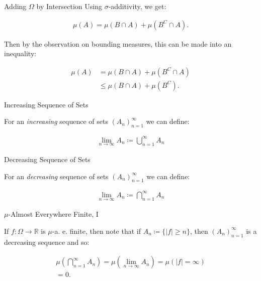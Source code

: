\documentclass[10pt,landscape]{article}
\renewcommand{\leq}{\leqslant}
\renewcommand{\geq}{\geqslant}
\begin{document}
\begin{multicols}{3}
\begin{observation}{}{Adding $\Omega$ by Intersection}
    Using $\sigma$-additivity, we get:

        \begin{align*}
            \mu(A) = \mu(B \cap A) + \mu(B^C \cap A).
        \end{align*}

    Then by the observation on bounding measures, this can be made into an inequality:

        \begin{align*}
            \mu(A) &= \mu(B \cap A) + \mu(B^C \cap A) \\
            &\leq \mu(B \cap A) + \mu(B^C).
        \end{align*}

\end{observation}

\begin{observation}{}{Increasing Sequence of Sets}

    For an \emph{increasing} sequence of sets $(A_n)_{n=1}^{\infty}$ we can define:

        \begin{align*}
            \lim_{n \to \infty} A_n \coloneqq \bigcup_{n=1}^{\infty} A_n
        \end{align*}

\end{observation}

\begin{observation}{}{Decreasing Sequence of Sets}

    For an \emph{decreasing} sequence of sets $(A_n)_{n=1}^{\infty}$ we can define:

        \begin{align*}
            \lim_{n \to \infty} A_n \coloneqq \bigcap_{n=1}^{\infty} A_n
        \end{align*}

\end{observation}

\begin{observation}{}{$\mu$-Almost Everywhere Finite, I}

    If $f: \Omega \to \mathbb{R}$ is $\mu$-a. e. finite, then note that if $A_n \coloneqq \{ |f| \geq n \}$, then $(A_n)_{n=1}^{\infty}$ is a decreasing sequence and so:

        \begin{align*}
            \mu\left(\bigcap_{n=1}^{\infty} A_n\right) = \mu\left(\lim_{n \to \infty} A_n\right) = \mu(|f| = \infty) \\ = 0.
        \end{align*}


\end{observation}
\end{multicols}
\end{document}
